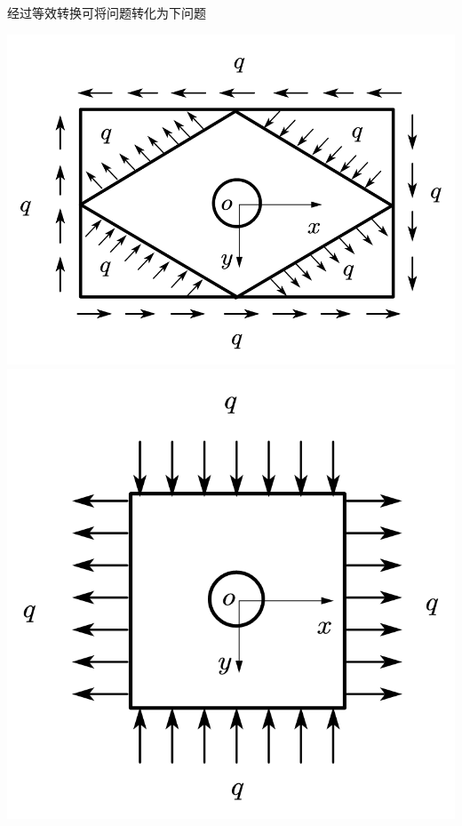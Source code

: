 \begin{remark}
经过等效转换可将问题转化为下问题\\
\centerline{\includegraphics[scale=0.45]{figure/4-13.png}\includegraphics[scale=0.45]{figure/4-14.png}}\\

\end{remark}
